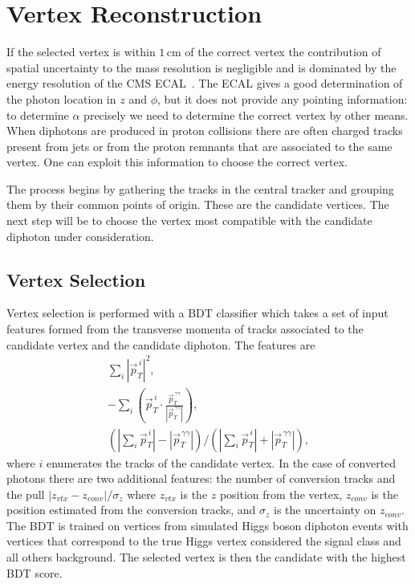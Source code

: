 \section{Vertex Reconstruction}
If the selected vertex is within $1$\,cm of the correct vertex the contribution of spatial uncertainty to the mass resolution is negligible and is dominated by the energy resolution of the CMS ECAL~\cite{HIG-16-040}. 
The ECAL gives a good determination of the photon location in $z$ and $\phi$, but it does not provide any pointing information: to determine $\alpha$ precisely we need to determine the correct vertex by other means.
When diphotons are produced in proton collisions there are often charged tracks present from jets or from the proton remnants that are associated to the same vertex. One can exploit this information to choose the correct vertex.  


The process begins by gathering the tracks in the central tracker and grouping them by their common points of origin. These are the candidate vertices. The next step will be to choose the vertex most compatible with the candidate diphoton under consideration.

\subsection{Vertex Selection}
Vertex selection is performed with a BDT classifier which takes a set of input features formed from the transverse momenta of tracks associated to the candidate vertex and the candidate diphoton. The features are
\begin{gather*}
    \sum_{i}|\vec{p}_{T}^{\,i}|^{2}, \\
    -\sum_{i}(\vec{p}_{T}^{\,i}\cdot\frac{\vec{p}_{T}^{\,\gamma\gamma}}{|\vec{p}_{T}^{\,\gamma\gamma}|}), \\
    (|\sum_{i}\vec{p}_{T}^{\,i}|-|\vec{p}_{T}^{\,\gamma\gamma}|)/(|\sum_{i}\vec{p}_{T}^{\,i}|+|\vec{p}_{T}^{\,\gamma\gamma}|),
\end{gather*}
where $i$ enumerates the tracks of the candidate vertex. In the case of converted photons there are two additional features: the number of conversion tracks and the pull $|z_{vtx} - z_{conv}|/\sigma_{z}$ where $z_{vtx}$ is the $z$ position from the vertex, $z_{conv}$ is the position estimated from the conversion tracks, and $\sigma_z$ is the uncertainty on $z_{conv}$.
The BDT is trained on vertices from simulated Higgs boson diphoton events with vertices that correspond to the true Higgs vertex considered the signal class and all others background. The selected vertex is then the candidate with the highest BDT score. 


